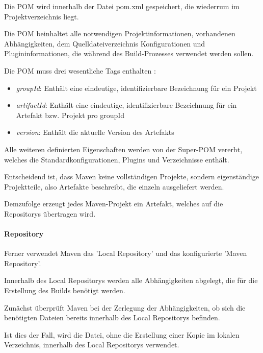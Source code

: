 Die POM wird innerhalb der Datei pom.xml gespeichert, die wiederrum im Projektverzeichnis liegt.

Die POM beinhaltet alle notwendigen Projektinformationen, vorhandenen Abhängigkeiten, dem Quelldateiverzeichnis Konfigurationen und Plugininformationen, die während des Build-Prozesses verwendet werden sollen.\cite{the_apache_software_foundation_maven_2002}

Die POM muss drei wesentliche Tags enthalten \cite[S. 77 - 78]{spiller_maven_2011}: 

\begin{itemize}
    \item \textit{groupId}: Enthält eine eindeutige, identifizierbare Bezeichnung für ein Projekt
    \item \textit{artifactId}: Enthält eine eindeutige, identifizierbare Bezeichnung für ein Artefakt bzw. Projekt pro groupId
    \item \textit{version}: Enthält die aktuelle Version des Artefakts
\end{itemize}

Alle weiteren definierten Eigenschaften werden von der Super-POM vererbt, welches die Standardkonfigurationen, Plugins und Verzeichnisse enthält.

Entscheidend ist, dass Maven keine vollständigen Projekte, sondern eigenständige Projektteile, also Artefakte beschreibt, die einzeln ausgeliefert werden. \cite[S. 29]{spiller_maven_2011}

Demzufolge erzeugt jedes Maven-Projekt ein Artefakt, welches auf die Repositorys übertragen wird. 

\paragraph{Repository}

Ferner verwendet Maven das 'Local Repository' und das konfigurierte 'Maven Repository'.

Innerhalb des Local Repositorys werden alle Abhängigkeiten abgelegt, die für die Erstellung des Builds benötigt werden. 

Zunächst überprüft Maven bei der Zerlegung der Abhängigkeiten, ob sich die benötigten Dateien bereits innerhalb des Local Repositorys befinden. \cite[S. 45 - 47]{loukides_maven_2008} 

Ist dies der Fall, wird die Datei, ohne die Erstellung einer Kopie im lokalen Verzeichnis, innerhalb des Local Repositorys verwendet.

